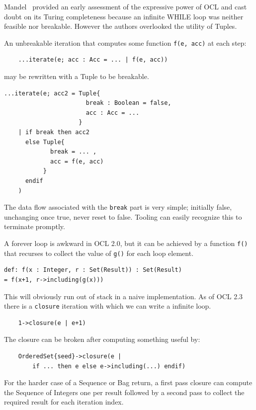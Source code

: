 \documentclass[sigconf]{acmart}
\begin{document}
Mandel~\cite{Mandel1999} provided an early assessment of the expressive power of OCL and cast doubt on its Turing completeness because an infinite WHILE loop was neither feasible nor breakable. However the authors overlooked the utility of Tuples.

An unbreakable iteration that computes some function \verb|f(e, acc)| at each step:

\begin{verbatim}
	...iterate(e; acc : Acc = ... | f(e, acc)) 
\end{verbatim} 

may be rewritten with a Tuple to be breakable.

\begin{verbatim}
...iterate(e; acc2 = Tuple{
                       break : Boolean = false,
                       acc : Acc = ...
                     }
    | if break then acc2
      else Tuple{
             break = ... ,
             acc = f(e, acc)
           }
      endif
    ) 
\end{verbatim} 

The data flow associated with the \verb|break| part is very simple; initially false, unchanging once true, never reset to false. Tooling can easily recognize this to terminate promptly.

A forever loop is awkward in OCL 2.0, but it can be achieved by a function \verb|f()| that recurses to collect the value of \verb|g()| for each loop element. 

\begin{verbatim}
def: f(x : Integer, r : Set(Result)) : Set(Result)
= f(x+1, r->including(g(x)))
\end{verbatim} 

This will obviously run out of stack in a naive implementation. As of OCL 2.3~\cite{OCL-2.3} there is a \verb|closure| iteration with which we can write a infinite loop.  

\begin{verbatim}
	1->closure(e | e+1)
\end{verbatim} 

The closure can be broken after computing something useful by:

\begin{verbatim}
	OrderedSet{seed}->closure(e |
	    if ... then e else e->including(...) endif)
\end{verbatim} 

For the harder case of a Sequence or Bag return, a first pass closure can compute the Sequence of Integers one per result followed by a second pass to collect the required result for each iteration index.
\end{document}
